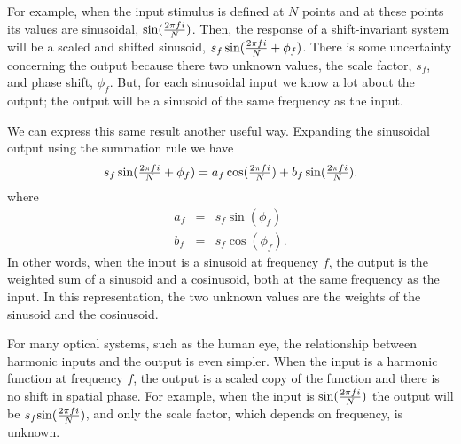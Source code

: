 For example, when the input stimulus is defined at $N$
points and at these points its values are sinusoidal, $\mbox{$\sin ( \frac {2 \pi f i}{ N } )$}$.
Then, the response of a shift-invariant system
will be a scaled and shifted sinusoid, $s_f \sin ( \mbox{$\frac {2 \pi f i}{ N }$} + \phi_f )$.
There is some uncertainty concerning the output
because there two unknown values,
the scale factor, $s_f$, and phase shift, $\phi_f$.
But, for each sinusoidal input we know a lot about the output;
the output will be a sinusoid of the same frequency as the input.

We can express this same result another useful way.
Expanding the sinusoidal output using the summation rule we have
\begin{equation} 
\label{e1:r1}
s_f \sin (\mbox{$\frac {2 \pi f i}{ N }$} + \phi_f ) = a_f \cos (\mbox{$\frac {2 \pi f i}{ N }$}) + b_f \sin (\mbox{$\frac {2 \pi f i}{ N }$}) .
\end{equation}
where
\begin{eqnarray}
a_f &=& s_f \sin ( \phi_f) \nonumber \\
b_f &=& s_f \cos ( \phi_f ).
\end{eqnarray}
In other words, when the input is a sinusoid at frequency $f$,
the output is the weighted
sum of a sinusoid and a cosinusoid, both at the
same frequency as the input.
In this representation, the two unknown values are the
weights of the sinusoid and the cosinusoid.

For many optical systems, such as the human eye, the relationship between
harmonic inputs and the output is even simpler.
When the input is a harmonic function at frequency $f$,
the output is a scaled copy of the function
and there is no shift in spatial phase.
For example, when the input is $\mbox{$\sin ( \frac {2 \pi f i}{ N } )$}$ the output will be $s_f \mbox{$\sin ( \frac {2 \pi f i}{ N } )$}$,
and only the scale factor, which depends on frequency, is unknown.
